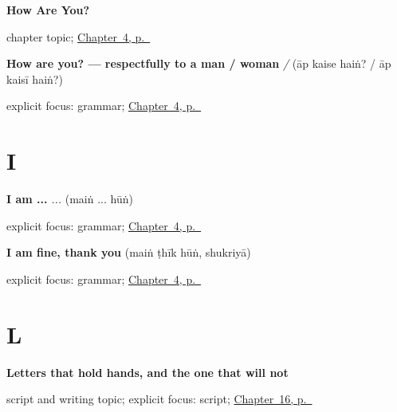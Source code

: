 \noindent\begin{minipage}[t]{\linewidth}
\raggedright
\textbf{How Are You?}\par
\footnotesize chapter topic; \hyperref[ch:ur-how-are-you]{Chapter~4, p.~\pageref*{ch:ur-how-are-you}}
\end{minipage}\par\smallskip

\noindent\begin{minipage}[t]{\linewidth}
\raggedright
\textbf{How are you? — respectfully to a man / woman}\enspace\emph{   /   }\enspace(āp kaise haiṅ? / āp kaisī haiṅ?)\par
\footnotesize explicit focus: grammar; \hyperref[ch:ur-how-are-you]{Chapter~4, p.~\pageref*{ch:ur-how-are-you}}
\end{minipage}\par\smallskip

\section*{I}

\noindent\begin{minipage}[t]{\linewidth}
\raggedright
\textbf{I am ...}\enspace\emph{ ... }\enspace(maiṅ ... hūṅ)\par
\footnotesize explicit focus: grammar; \hyperref[ch:ur-how-are-you]{Chapter~4, p.~\pageref*{ch:ur-how-are-you}}
\end{minipage}\par\smallskip

\noindent\begin{minipage}[t]{\linewidth}
\raggedright
\textbf{I am fine, thank you}\enspace\emph{   }\enspace(maiṅ ṭhīk hūṅ, shukriyā)\par
\footnotesize explicit focus: grammar; \hyperref[ch:ur-how-are-you]{Chapter~4, p.~\pageref*{ch:ur-how-are-you}}
\end{minipage}\par\smallskip

\section*{L}

\noindent\begin{minipage}[t]{\linewidth}
\raggedright
\textbf{Letters that hold hands, and the one that will not}\par
\footnotesize script and writing topic; explicit focus: script; \hyperref[ch:ur-script-seven]{Chapter~16, p.~\pageref*{ch:ur-script-seven}}
\end{minipage}\par\smallskip

